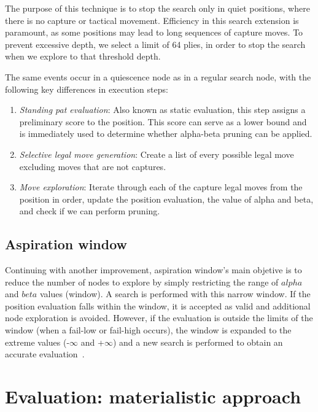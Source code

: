 \noindent The purpose of this technique is to stop the search only in quiet positions, where there is no capture or tactical movement. Efficiency in this search extension is paramount, as some positions may lead to long sequences of capture moves. To prevent excessive depth, we select a limit of 64 plies, in order to stop the search when we explore to that threshold depth.

\vspace{1em}

\noindent The same events occur in a quiescence node as in a regular search node, with the following key differences in execution steps:

\begin{enumerate}
    \item \textit{Standing pat evaluation}: Also known as static evaluation, this step assigns a preliminary score to the position. This score can serve as a lower bound and is immediately used to determine whether alpha-beta pruning can be applied.
    \item \textit{Selective legal move generation}: Create a list of every possible legal move excluding moves that are not captures.
    \item \textit{Move exploration}: Iterate through each of the capture legal moves from the position in order, update the position evaluation, the value of alpha and beta, and check if we can perform pruning.
\end{enumerate}

\subsection*{Aspiration window}\label{sec:aspiration-window}

Continuing with another improvement, aspiration window's main objetive is to reduce the number of nodes to explore by simply restricting the range of $alpha$ and $beta$ values (window). A search is performed with this narrow window. If the position evaluation falls within the window, it is accepted as valid and additional node exploration is avoided. However, if the evaluation is outside the limits of the window (when a fail-low or fail-high occurs), the window is expanded to the extreme values (-$\infty$ and +$\infty$) and a new search is performed to obtain an accurate evaluation~\cite{AspirationWindow}.

\section{Evaluation: materialistic approach}\label{sec:evaluation}

